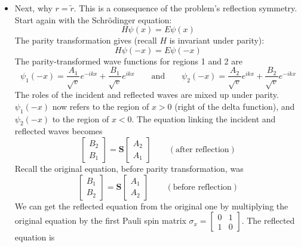 \documentclass[11pt, a4paper]{article}
\newcommand{\eqtext}[1]{\qquad \text{#1} \qquad}
\newcommand{\schro}{Schr\"{o}dinger\xspace}
\newcommand{\mat}[1]{\mathbf{#1}} %
\begin{document}
\begin{itemize}
	\item Next, why $ r = \tilde{r} $. This is a consequence of the problem's reflection symmetry. Start again with the \schro equation:
	\begin{equation*}
		H \psi(x) = E \psi(x)
	\end{equation*}
	The parity transformation gives (recall $ H $ is invariant under parity):
	\begin{equation*}
		H\psi(-x) = E\psi(-x)
	\end{equation*}
	The parity-transformed wave functions for regions 1 and 2 are
	\begin{equation*}
		\psi_{1}(-x) = \frac{A_{1}}{\sqrt{v}} e^{-ikx} + \frac{B_{1}}{\sqrt{v}}e^{ikx} \eqtext{and} \psi_{2}(-x) = \frac{A_{2}}{\sqrt{v}} e^{ikx} + \frac{B_{2}}{\sqrt{v}}e^{-ikx}
	\end{equation*}
	The roles of the incident and reflected waves are mixed up under parity. $ \psi_{1}(-x) $ now refers to the region of $ x > 0 $ (right of the delta function), and $ \psi_{2}(-x) $ to the region of $ x < 0 $. The equation linking the incident and reflected waves becomes
	\begin{equation*}
		\begin{bmatrix}
			B_{2}\\
			B_{1} 
		\end{bmatrix}
		= 
		\mat{S}
		\begin{bmatrix}
			A_{2}\\
			A_{1}
		\end{bmatrix}
		\qquad (\text{after reflection})
	\end{equation*}
	Recall the original equation, before parity transformation, was
	\begin{equation*}
		\begin{bmatrix}
			B_{1}\\
			B_{2} 
		\end{bmatrix}
		= 
		\mat{S}
		\begin{bmatrix}
			A_{1}\\
			A_{2}
		\end{bmatrix}
		\qquad (\text{before reflection})
	\end{equation*}
	We can get the reflected equation from the original one by multiplying the original equation by the first Pauli spin matrix $ \sigma_{x} = 
	\begin{bmatrix}
		0 & 1\\
		1 & 0
	\end{bmatrix}$. The reflected equation is
	\begin{equation*}

\end{equation*}
\end{itemize}
\end{document}
